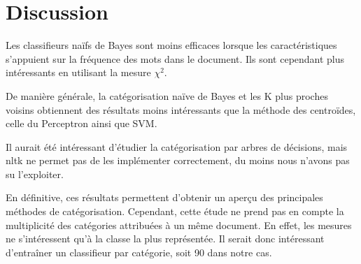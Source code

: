 \documentclass[a4paper,12pt]{article}
\begin{document}
	\section*{Discussion}

		Les classifieurs naïfs de Bayes sont moins efficaces lorsque les caractéristiques s'appuient sur la fréquence des mots dans le document. Ils sont cependant plus intéressants en utilisant la mesure $\chi^2$.

		De manière générale, la catégorisation naïve de Bayes et les K plus proches voisins obtiennent des résultats moins intéressants que la méthode des centroïdes, celle du Perceptron ainsi que SVM.

		Il aurait été intéressant d'étudier la catégorisation par arbres de décisions, mais nltk ne permet pas de les implémenter correctement, du moins nous n'avons pas su l'exploiter.

		En définitive, ces résultats permettent d'obtenir un aperçu des principales méthodes de catégorisation. Cependant, cette étude ne prend pas en compte la multiplicité des catégories attribuées à un même document. En effet, les mesures ne s'intéressent qu'à la classe la plus représentée. Il serait donc intéressant d'entraîner un classifieur par catégorie, soit 90 dans notre cas.
\end{document}
